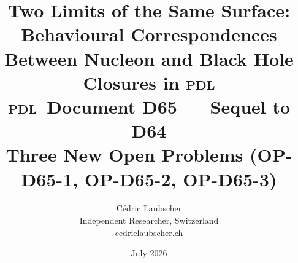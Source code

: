 \documentclass[12pt,a4paper]{article}
\newcommand{\PDL}{\textsc{pdl}}
\begin{document}
\title{\textbf{Two Limits of the Same Surface: Behavioural
Correspondences Between Nucleon and Black Hole Closures in
\PDL}\\[6pt]
{\large \PDL\ Document D65 --- Sequel to D64\\
Three New Open Problems (OP-D65-1, OP-D65-2, OP-D65-3)}}

\author{C\'edric Laubscher\\[4pt]
\small Independent Researcher, Switzerland\\
\small \href{https://cedriclaubscher.ch}{cedriclaubscher.ch}}

\date{July 2026}

\maketitle
\end{document}
